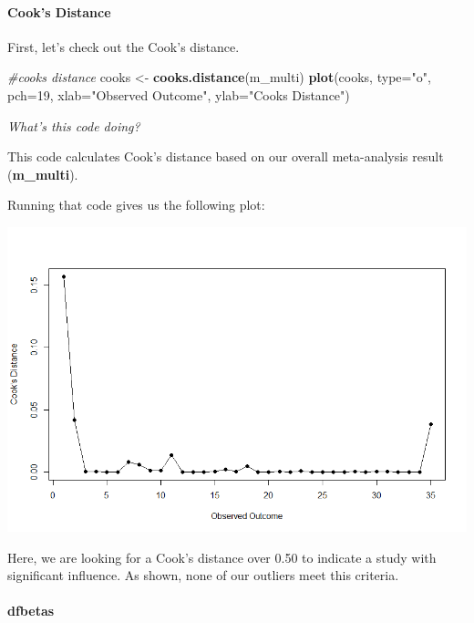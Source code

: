 \documentclass[
]{book}
\newenvironment{Shaded}{\begin{snugshade}}{\end{snugshade}}
\newcommand{\AttributeTok}[1]{\textcolor[rgb]{0.13,0.29,0.53}{#1}}
\newcommand{\CommentTok}[1]{\textcolor[rgb]{0.56,0.35,0.01}{\textit{#1}}}
\newcommand{\DecValTok}[1]{\textcolor[rgb]{0.00,0.00,0.81}{#1}}
\newcommand{\FunctionTok}[1]{\textcolor[rgb]{0.13,0.29,0.53}{\textbf{#1}}}
\newcommand{\NormalTok}[1]{#1}
\newcommand{\OtherTok}[1]{\textcolor[rgb]{0.56,0.35,0.01}{#1}}
\newcommand{\StringTok}[1]{\textcolor[rgb]{0.31,0.60,0.02}{#1}}
\begin{document}
\hypertarget{cooks-distance}{%
\paragraph{Cook's Distance}\label{cooks-distance}}

First, let's check out the Cook's distance.

\begin{Shaded}
\begin{Highlighting}[]
\CommentTok{\#cook\textquotesingle{}s distance}
\NormalTok{cooks }\OtherTok{\textless{}{-}} \FunctionTok{cooks.distance}\NormalTok{(m\_multi)}
\FunctionTok{plot}\NormalTok{(cooks, }\AttributeTok{type=}\StringTok{"o"}\NormalTok{, }\AttributeTok{pch=}\DecValTok{19}\NormalTok{, }\AttributeTok{xlab=}\StringTok{"Observed Outcome"}\NormalTok{, }\AttributeTok{ylab=}\StringTok{"Cook\textquotesingle{}s Distance"}\NormalTok{)}
\end{Highlighting}
\end{Shaded}

\emph{What's this code doing?}

This code calculates Cook's distance based on our overall meta-analysis result (\textbf{m\_multi}).

Running that code gives us the following plot:

\includegraphics[width=1\textwidth,height=\textheight]{images/cook3level.png}

Here, we are looking for a Cook's distance over 0.50 to indicate a study with significant influence. As shown, none of our outliers meet this criteria.

\hypertarget{dfbetas}{%
\paragraph{dfbetas}\label{dfbetas}}
\end{document}
